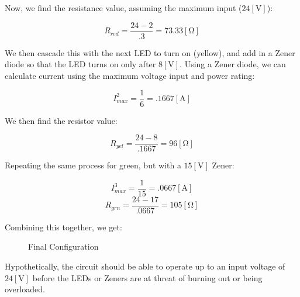 \begin{enumerate}
    Now, we find the resistance value, assuming the maximum input ($24[\si{\volt}]$):

    $$R_{red}=\frac{24-2}{.3}=73.33[\si{\ohm}]$$

    We then cascade this with the next LED to turn on (yellow), and add in a Zener diode so that the LED turns on only after $8[\si{\volt}]$. Using a Zener diode, we can calculate current using the maximum voltage input and power rating:

    $$I_{max}^2=\frac{1}{6}=.1667[\si{\ampere}]$$

    We then find the resistor value:

    $$R_{yel}=\frac{24-8}{.1667}=96[\si{\ohm}]$$

    Repeating the same process for green, but with a $15[\si{\volt}]$ Zener:

    $$I_{max}^3=\frac{1}{15}=.0667[\si{\ampere}]$$
    $$R_{grn}=\frac{24-17}{.0667}=105[\si{\ohm}]$$

    Combining this together, we get:

    \begin{figure}[H]
      \centering
      
      \caption{Final Configuration}
      \label{fig:1}
    \end{figure}

    Hypothetically, the circuit should be able to operate up to an input voltage of $24[\si{\volt}]$ before the LEDs or Zeners are at threat of burning out or being overloaded.

\end{enumerate}



